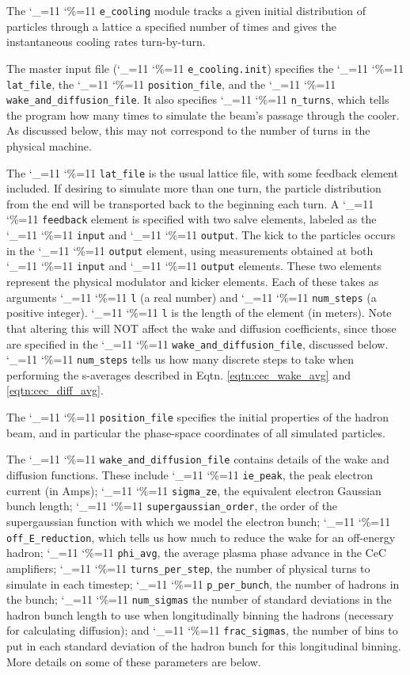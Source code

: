 \documentclass[letterpaper,11pt]{article}
\newcommand{\vn}{\begingroup\catcode`\_=11 \catcode`\%=11 \dottcmd}
\newcommand\dottcmd[1]{\texttt{#1}\endgroup}
\begin{document}
The \vn{e_cooling} module tracks a given initial distribution of particles through a lattice a specified number of times and gives the instantaneous cooling rates turn-by-turn.

The master input file (\vn{e_cooling.init}) specifies the \vn{lat_file}, the \vn{position_file}, and the \vn{wake_and_diffusion_file}. It also specifies \vn{n_turns}, which tells the program how many times to simulate the beam's passage through the cooler. As discussed below, this may not correspond to the number of turns in the physical machine.

The \vn{lat_file} is the usual lattice file, with some feedback element included. If desiring to simulate more than one turn, the particle distribution from the end will be transported back to the beginning each turn. A \vn{feedback} element is specified with two salve elements, labeled as the \vn{input} and \vn{output}. The kick to the particles occurs in the \vn{output} element, using measurements obtained at both \vn{input} and \vn{output} elements. These two elements represent the physical modulator and kicker elements. Each of these takes as arguments \vn{l} (a real number) and \vn{num_steps} (a positive integer). \vn{l} is the length of the element (in meters). Note that altering this will NOT affect the wake and diffusion coefficients, since those are specified in the \vn{wake_and_diffusion_file}, discussed below. \vn{num_steps} tells us how many discrete steps to take when performing the s-averages described in Eqtn. \ref{eqtn:cec_wake_avg} and \ref{eqtn:cec_diff_avg}.

The \vn{position_file} specifies the initial properties of the hadron beam, and in particular the phase-space coordinates of all simulated particles.

The \vn{wake_and_diffusion_file} contains details of the wake and diffusion functions. These include \vn{ie_peak}, the peak electron current (in Amps); \vn{sigma_ze}, the equivalent electron Gaussian bunch length; \vn{supergaussian_order}, the order of the supergaussian function with which we model the electron bunch; \vn{off_E_reduction}, which tells us how much to reduce the wake for an off-energy hadron; \vn{phi_avg}, the average plasma phase advance in the CeC amplifiers; \vn{turns_per_step}, the number of physical turns to simulate in each timestep; \vn{p_per_bunch}, the number of hadrons in the bunch; \vn{num_sigmas} the number of standard deviations in the hadron bunch length to use when longitudinally binning the hadrons (necessary for calculating diffusion); and \vn{frac_sigmas}, the number of bins to put in each standard deviation of the hadron bunch for this longitudinal binning. More details on some of these parameters are below.
\end{document}
